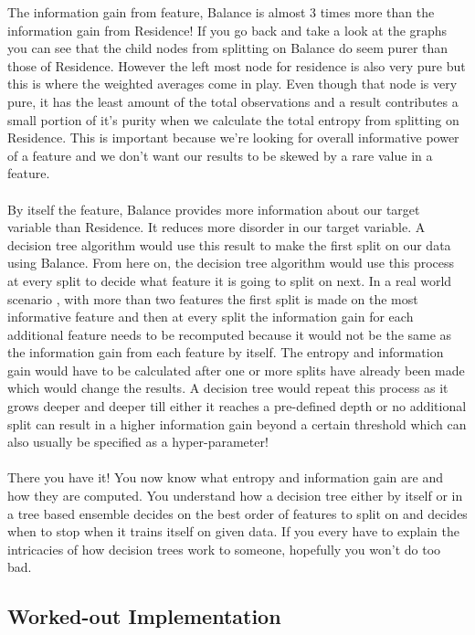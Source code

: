 	The information gain from feature, Balance is almost 3 times more than the information gain from Residence! If you go back and take a look at the graphs you can see that the child nodes from splitting on Balance do seem purer than those of Residence. However the left most node for residence is also very pure but this is where the weighted averages come in play. Even though that node is very pure, it has the least amount of the total observations and a result contributes a small portion of it’s purity when we calculate the total entropy from splitting on Residence. This is important because we’re looking for overall informative power of a feature and we don’t want our results to be skewed by a rare value in a feature.
	\\ \\
	By itself the feature, Balance provides more information about our target variable than Residence. It reduces more disorder in our target variable. A decision tree algorithm would use this result to make the first split on our data using Balance. From here on, the decision tree algorithm would use this process at every split to decide what feature it is going to split on next. In a real world scenario , with more than two features the first split is made on the most informative feature and then at every split the information gain for each additional feature needs to be recomputed because it would not be the same as the information gain from each feature by itself. The entropy and information gain would have to be calculated after one or more splits have already been made which would change the results. A decision tree would repeat this process as it grows deeper and deeper till either it reaches a pre-defined depth or no additional split can result in a higher information gain beyond a certain threshold which can also usually be specified as a hyper-parameter!
	\\ \\
	There you have it! You now know what entropy and information gain are and how they are computed. You understand how a decision tree either by itself or in a tree based ensemble decides on the best order of features to split on and decides when to stop when it trains itself on given data. If you every have to explain the intricacies of how decision trees work to someone, hopefully you won’t do too bad.\\

\subsection*{Worked-out Implementation}

